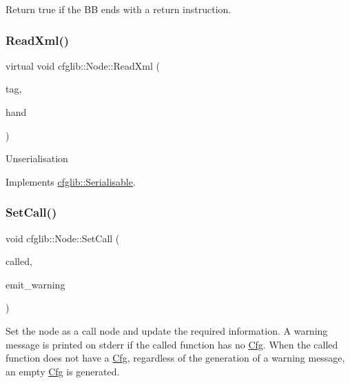 Return true if the BB ends with a return instruction. \mbox{\label{classcfglib_1_1Node_aaab769075e5d02c61411d58fc94e2070}} 
\subsubsection{\texorpdfstring{Read\+Xml()}{ReadXml()}}
{\footnotesize\ttfamily virtual void cfglib\+::\+Node\+::\+Read\+Xml (\begin{DoxyParamCaption}\item[{\hyperlink{classXmlTag}{Xml\+Tag} const $\ast$}]{tag,  }\item[{\hyperlink{classcfglib_1_1Handle}{Handle} \&}]{hand }\end{DoxyParamCaption})\hspace{0.3cm}{\ttfamily [virtual]}}

Unserialisation 

Implements \hyperlink{classcfglib_1_1Serialisable_a876d530446317872259356af9b016e13}{cfglib\+::\+Serialisable}.

\mbox{\label{classcfglib_1_1Node_a1ffbf02ce392ebbed1e56f75c3bb268d}} 
\subsubsection{\texorpdfstring{Set\+Call()}{SetCall()}}
{\footnotesize\ttfamily void cfglib\+::\+Node\+::\+Set\+Call (\begin{DoxyParamCaption}\item[{string}]{called,  }\item[{bool}]{emit\+\_\+warning }\end{DoxyParamCaption})}

Set the node as a call node and update the required information. A warning message is printed on stderr if the called function has no \hyperlink{classcfglib_1_1Cfg}{Cfg}. When the called function does not have a \hyperlink{classcfglib_1_1Cfg}{Cfg}, regardless of the generation of a warning message, an empty \hyperlink{classcfglib_1_1Cfg}{Cfg} is generated. \mbox{\label{classcfglib_1_1Node_a648aaa3e2703c9b5932bc50ffb14942c}} 

